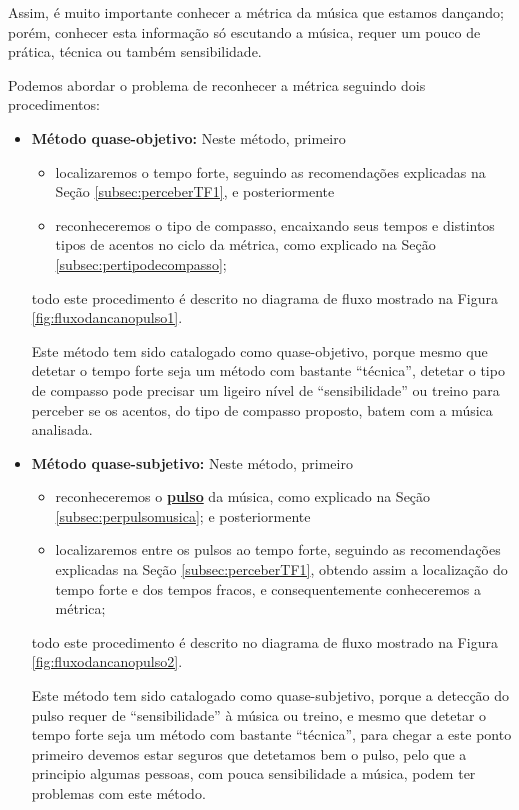Assim, é muito importante conhecer a métrica da música que estamos dançando;
porém, conhecer esta informação só escutando a música, requer um pouco de prática,
 técnica ou também sensibilidade.

Podemos abordar o problema de reconhecer a métrica seguindo dois procedimentos:
\begin{itemize}
\item \textbf{Método quase-objetivo:} Neste método, primeiro
\begin{itemize} 
\item localizaremos o tempo forte, seguindo as recomendações explicadas na Seção \ref{subsec:perceberTF1},
e posteriormente 
\item reconheceremos o tipo de compasso, 
encaixando seus tempos e distintos tipos de acentos no ciclo da métrica, 
como explicado na Seção \ref{subsec:pertipodecompasso};
\end{itemize}
todo este procedimento é descrito no diagrama de fluxo mostrado na Figura \ref{fig:fluxodancanopulso1}.

Este método tem sido catalogado como quase-objetivo,
porque mesmo que detetar o tempo forte seja um método com bastante ``técnica'',
detetar o tipo de compasso pode precisar um ligeiro nível de ``sensibilidade'' ou treino
para perceber se os acentos, do tipo de compasso proposto, batem com a música analisada. 
\item \textbf{Método quase-subjetivo:} Neste método, primeiro 
\begin{itemize}
\item reconheceremos o \hyperref[ref:Pulso]{\textbf{pulso}} da música, como explicado na Seção \ref{subsec:perpulsomusica};
e posteriormente 
\item localizaremos entre os pulsos ao tempo forte, 
seguindo as recomendações explicadas na Seção \ref{subsec:perceberTF1},
obtendo assim a localização do tempo forte e dos tempos fracos, e consequentemente conheceremos a métrica;
\end{itemize}
todo este procedimento é descrito no diagrama de fluxo mostrado na Figura \ref{fig:fluxodancanopulso2}.

Este método tem sido catalogado como quase-subjetivo,
porque a detecção do pulso requer de  ``sensibilidade'' à música ou treino,
e mesmo que detetar o tempo forte seja um método com bastante ``técnica'',
para chegar a este ponto primeiro devemos estar seguros que detetamos bem o pulso,
pelo que a principio algumas pessoas, com pouca sensibilidade a música, podem ter problemas com este método.
\end{itemize}

